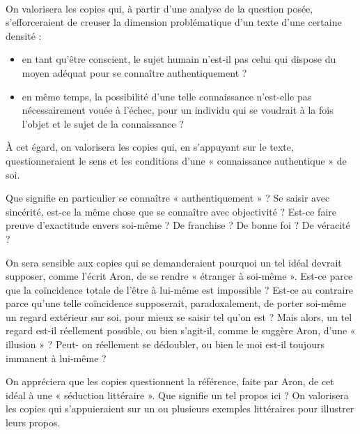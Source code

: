\vfill{~}\newpage
		{On valorisera les copies qui, à partir d’une analyse de la question posée,
s’efforceraient de creuser la dimension problématique d’un texte d’une certaine
densité :

\begin{itemize}
\item en tant qu’être conscient, le sujet humain n’est-il pas celui qui dispose du moyen
adéquat pour se connaître authentiquement ?
\item en même temps, la possibilité d’une telle connaissance n’est-elle pas
nécessairement vouée à l’échec, pour un individu qui se voudrait à la fois l’objet
et le sujet de la connaissance ?
\end{itemize}
À cet égard, on valorisera les copies qui, en s’appuyant sur le texte, questionneraient
le sens et les conditions d’une « connaissance authentique » de soi.

Que signifie en particulier se connaître « authentiquement » ? Se saisir avec sincérité,
est-ce la même chose que se connaître avec objectivité ? Est-ce faire preuve
d’exactitude envers soi-même ? De franchise ? De bonne foi ? De véracité ?

On sera sensible aux copies qui se demanderaient pourquoi un tel idéal devrait
supposer, comme l’écrit Aron, de se rendre « étranger à soi-même ». Est-ce parce que
la coïncidence totale de l’être à lui-même est impossible ? Est-ce au contraire parce qu’une telle coïncidence supposerait, paradoxalement, de porter soi-même un regard
extérieur sur soi, pour mieux se saisir tel qu’on est ? Mais alors, un tel regard est-il
réellement possible, ou bien s’agit-il, comme le suggère Aron, d’une « illusion » ? Peut-
on réellement se dédoubler, ou bien le moi est-il toujours immanent à lui-même ?

On appréciera que les copies questionnent la référence, faite par Aron, de cet idéal à
une « séduction littéraire ». Que signifie un tel propos ici ? On valorisera les copies qui
s’appuieraient sur un ou plusieurs exemples littéraires pour illustrer leurs propos.

}
